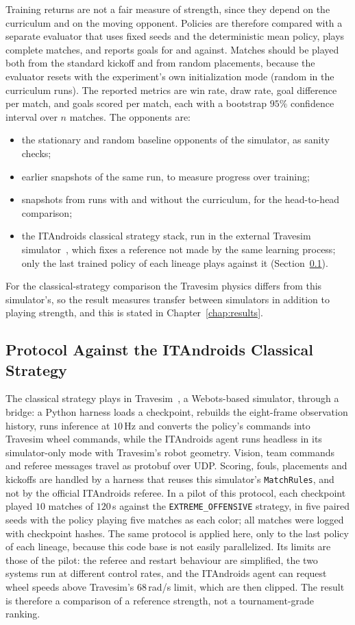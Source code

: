 Training returns are not a fair measure of strength, since they depend on the curriculum and on the moving opponent.  Policies are therefore compared with a
separate evaluator that uses fixed seeds and the deterministic mean policy, plays complete matches, and reports goals for and against.  Matches should be played both from the standard kickoff and from random
placements, because the evaluator resets with the experiment's own initialization mode (random in the curriculum runs).  The reported
metrics are win rate, draw rate, goal difference per match, and goals scored per match, each with a bootstrap $95\%$ confidence interval over $n$ matches.  %
The opponents are:
\begin{itemize}
  \item the stationary and random baseline opponents of the simulator, as sanity checks;
  \item earlier snapshots of the same run, to measure progress over training;
  \item snapshots from runs with and without the curriculum, for the head-to-head comparison;
  \item the ITAndroids classical strategy stack, run in the external Travesim simulator~\cite{travesim}, which fixes a reference not made by the same learning process; only the last trained policy of each lineage plays against it (Section~\ref{sec:itandroids_eval}).
\end{itemize}
For the classical-strategy comparison the Travesim physics differs from this simulator's, so the result measures transfer between simulators in
addition to playing strength, and this is stated in Chapter~\ref{chap:results}.

\subsection{Protocol Against the ITAndroids Classical Strategy}
\label{sec:itandroids_eval}

The classical strategy plays in Travesim~\cite{travesim}, a Webots-based simulator, through a bridge: a Python harness loads a checkpoint, rebuilds the eight-frame observation history, runs inference at $10$\,Hz and converts the
policy's commands into Travesim wheel commands, while the ITAndroids agent runs headless in its simulator-only mode with Travesim's robot geometry.  Vision, team commands and referee messages travel as protobuf over UDP.  Scoring, fouls, placements
and kickoffs are handled by a harness that reuses this simulator's \texttt{MatchRules}, and not by the official ITAndroids referee.  In a pilot of this protocol, each checkpoint played $10$ matches of $120$\,s against the \texttt{EXTREME\_OFFENSIVE} strategy, in five paired seeds with the policy
playing five matches as each color; all matches were logged with checkpoint hashes.  The same protocol is applied here, only to the last policy of each lineage, because this code base is not easily parallelized.  
Its limits are those of the pilot: the referee and restart behaviour are simplified, the two systems run at different control rates, and the ITAndroids agent can request wheel speeds above Travesim's $68$\,rad/s limit, which are then clipped.  The result is therefore a comparison of a reference strength, not a tournament-grade ranking.
